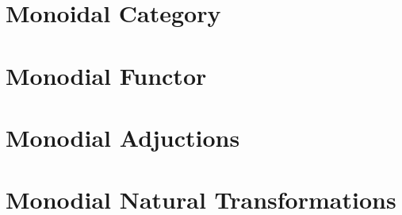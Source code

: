 \documentclass[11pt]{article}
\begin{document}
\tableofcontents

\section{Monoidal Category}
\label{sec:monoidal_category}


\section{Monodial Functor}
\label{sec:monoidal_funtor}


\section{Monodial Adjuctions}
\label{sec:monodial_adjuctions}

\section{Monodial Natural Transformations}
\label{sec:monodial_natural_transformations}
\end{document}
